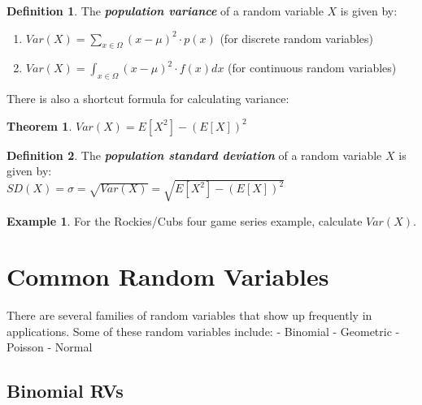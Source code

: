 \documentclass[
  11pt,
]{book}
\newtheorem{theorem}{Theorem}[chapter]
\theoremstyle{definition}
\newtheorem{definition}{Definition}[chapter]
\theoremstyle{definition}
\newtheorem{example}{Example}[chapter]
\theoremstyle{definition}
\theoremstyle{definition}
\theoremstyle{remark}
\begin{document}
\begin{definition}

The \textbf{\emph{population variance}} of a random variable \(X\) is given by:\\

\begin{enumerate}
\def\labelenumi{(\roman{enumi})}
\item
  \(Var(X) = \sum_{x \in \Omega} (x-\mu)^2 \cdot p(x)\) (for discrete random variables)
\item
  \(Var(X) = \int_{x \in \Omega} (x-\mu)^2 \cdot f(x) dx\) (for continuous random variables)
\end{enumerate}

\end{definition}

There is also a shortcut formula for calculating variance:\\

\begin{theorem}
\(Var(X) = E[X^2] - (E[X])^2\)
\end{theorem}

\begin{definition}
The \textbf{\emph{population standard deviation}} of a random variable \(X\) is given by:\\

\(SD(X) = \sigma = \sqrt{Var(X)} = \sqrt{E[X^2]-(E[X])^2}\)
\end{definition}

\begin{example}
For the Rockies/Cubs four game series example, calculate \(Var(X)\).
\end{example}

\hfill\break
\hfill\break
\hfill\break
\hfill\break
\hfill\break

\newpage

\hypertarget{common-random-variables}{%
\section{Common Random Variables}\label{common-random-variables}}

There are several families of random variables that show up frequently in applications. Some of these random variables include:
- Binomial
- Geometric
- Poisson
- Normal

\hypertarget{binomial-rvs}{%
\subsection{Binomial RVs}\label{binomial-rvs}}
\end{document}
